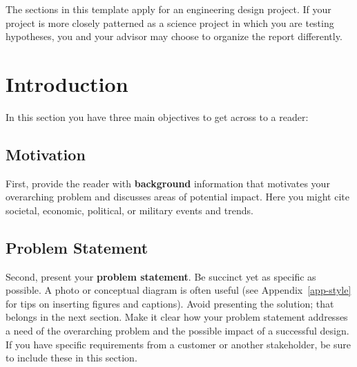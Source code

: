 \documentclass{wrcecapstone}
\begin{document}
The sections in this template apply for an engineering design project. If your project is more closely patterned as a science project in which you are testing hypotheses, you and your advisor may choose to organize the report differently. 




\section{Introduction}
In this section you have three main objectives to get across to a reader:  

\subsection{Motivation}
First, provide the reader with \textbf{background} information that motivates your overarching problem and discusses areas of potential impact.  Here you might cite societal, economic, political, or military events and trends.

\subsection{Problem Statement}
Second, present your \textbf{problem statement}.   Be succinct yet as specific as possible.  A photo or conceptual diagram is often useful (see Appendix~\ref{app-style} for tips on inserting figures and captions).   Avoid presenting the solution; that belongs in the next section.  Make it clear how your problem statement addresses a need of the overarching problem and the possible impact of a successful design.  If you have specific requirements from a customer or another stakeholder, be sure to include these in this section.
\end{document}
